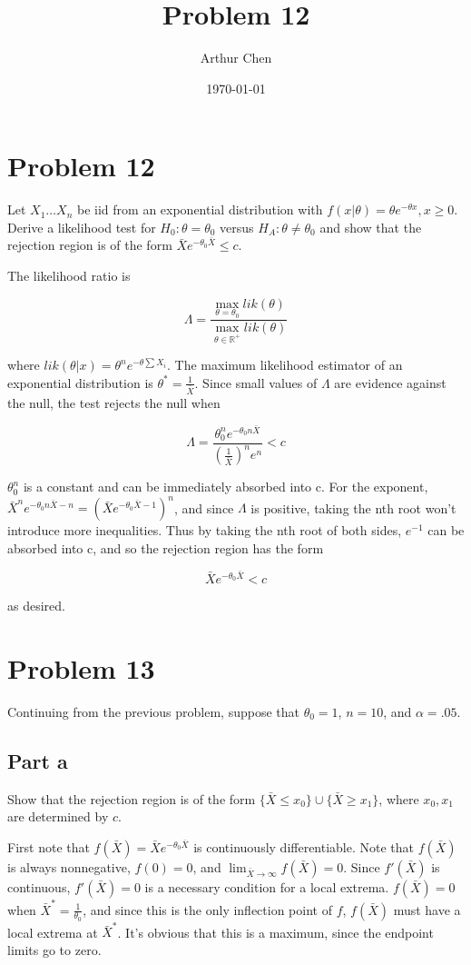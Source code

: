 \documentclass{article}
\author{Arthur Chen}
\title{Problem 12}
\date{\today}
\begin{document}
\section*{Problem 12}

Let $X_1 \dots X_n$ be iid from an exponential distribution with $f(x|\theta) = \theta e^{-\theta x}, x \geq 0$. Derive a likelihood test for $H_0: \theta = \theta_0$ versus $H_A: \theta \neq \theta_0$ and show that the rejection region is of the form $\bar{X} e^{-\theta_0 \bar{X}} \leq c$.

The likelihood ratio is

\[
\Lambda = \frac{\max_{\theta = \theta_0} lik(\theta)}
{\max_{\theta \in \mathbb{R^+}} lik(\theta)}
\]

where $lik(\theta|x) = \theta^n e^{-\theta \sum X_i}$. The maximum likelihood estimator of an exponential distribution is $\theta^* = \frac{1}{\bar{X}}$. Since small values of $\Lambda$ are evidence against the null, the test rejects the null when

\[
\Lambda = \frac{\theta_0^n e^{-\theta_0 n \bar{X}}}
{(\frac{1}{\bar{X}})^n e^n} < c
\]

$\theta_0^n$ is a constant and can be immediately absorbed into c. For the exponent, $\bar{X}^n e^{-\theta_0 n \bar{X} - n} = (\bar{X}e^{-\theta_0 \bar{X}-1})^n$, and since $\Lambda$ is positive, taking the nth root won't introduce more inequalities. Thus by taking the nth root of both sides, $e^{-1}$ can be absorbed into c, and so the rejection region has the form

\[
\bar{X} e^{-\theta_0 \bar{X}} < c
\]

as desired.

\section*{Problem 13}

Continuing from the previous problem, suppose that $\theta_0 = 1$, $n = 10$, and $\alpha = .05$.

\subsection*{Part a}

Show that the rejection region is of the form $\{\bar{X} \leq x_0\} \cup \{\bar{X} \geq x_1\}$, where $x_0, x_1$ are determined by $c$.

First note that $f(\bar{X}) = \bar{X}e^{-\theta_0 \bar{X}}$ is continuously differentiable. Note that $f(\bar{X})$ is always nonnegative, $f(0) = 0$, and $\lim_{\bar{X} \rightarrow \infty} f(\bar{X}) = 0$. Since $f'(\bar{X})$ is continuous, $f'(\bar{X}) = 0$ is a necessary condition for a local extrema. $f(\bar{X}) = 0$ when $\bar{X}^* = \frac{1}{\theta_0}$, and since this is the only inflection point of $f$, $f(\bar{X})$ must have a local extrema at $\bar{X}^*$. It's obvious that this is a maximum, since the endpoint limits go to zero.
\end{document}
